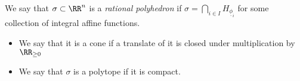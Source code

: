 

    We say that $\sigma\subset \RR^n$ is a \emph{rational polyhedron} if $\sigma = \bigcap_{i\in I} H_{\underline \phi_i}$ for some collection of integral affine functions.
    \begin{itemize}
        \item We say that it is a cone  if a translate of it is closed under multiplication by $\RR_{\geq 0}$
        \item We say that $\sigma$ is a polytope if it is compact. 
    \end{itemize}

